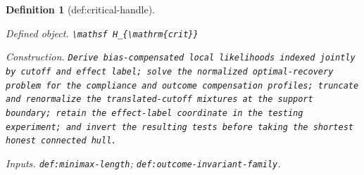 \documentclass{article}
\newtheorem{definition}{Definition}
\begin{document}
\begin{definition}[def:critical-handle]\label{def:critical-handle}
\par\smallskip\noindent\emph{Defined object.} \texttt{\textbackslash{}\allowbreak{}mathsf H\_\allowbreak{}\{\textbackslash{}\allowbreak{}mathrm\{crit\}\allowbreak{}\}\allowbreak{}}
\par\smallskip\noindent\emph{Construction.} \texttt{Derive bias-\allowbreak{}compensated local likelihoods indexed jointly by cutoff and effect label;\allowbreak{} solve the normalized optimal-\allowbreak{}recovery problem for the compliance and outcome compensation profiles;\allowbreak{} truncate and renormalize the translated-\allowbreak{}cutoff mixtures at the support boundary;\allowbreak{} retain the effect-\allowbreak{}label coordinate in the testing experiment;\allowbreak{} and invert the resulting tests before taking the shortest honest connected hull.}
\par\smallskip\noindent\emph{Inputs.} \texttt{def:\allowbreak{}minimax-\allowbreak{}length}; \texttt{def:\allowbreak{}outcome-\allowbreak{}invariant-\allowbreak{}family}.
\end{definition}
\end{document}
